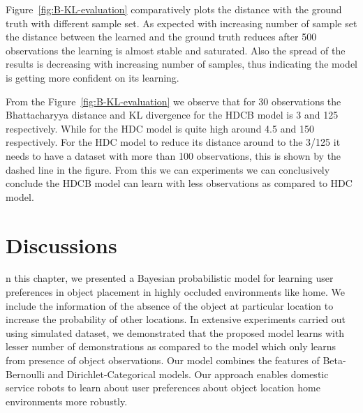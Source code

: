 Figure~\ref{fig:B-KL-evaluation} comparatively plots the distance with the ground truth with different sample set. As expected with increasing number of sample set the distance between the learned and the ground truth reduces after 500 observations the learning is almost stable and saturated. Also the spread of the results is decreasing with increasing number of samples, thus indicating the model is getting more confident on its learning. 

From the Figure~\ref{fig:B-KL-evaluation} we observe that for 30 observations the Bhattacharyya distance  and KL divergence for the HDCB model is 3 and 125 respectively. While for the HDC model is quite high around 4.5 and 150 respectively. For the HDC model to reduce its distance around to the 3/125 it needs to have a dataset with more than 100 observations, this is shown by the dashed line in the figure. From this we can experiments we can conclusively conclude the HDCB model can learn with less observations as compared to HDC model.
 

\section{Discussions}

n this chapter, we presented a Bayesian probabilistic model for learning user preferences in object placement in highly occluded environments like home. We include the information of the absence of the object at particular location to increase the probability of other locations. In extensive experiments carried out using simulated dataset, we demonstrated that the proposed model learns with lesser number of demonstrations as compared to the model which only learns from presence of object observations. Our model combines the features of Beta-Bernoulli and Dirichlet-Categorical models. Our approach enables domestic service robots to learn about user preferences about object location home environments more robustly.